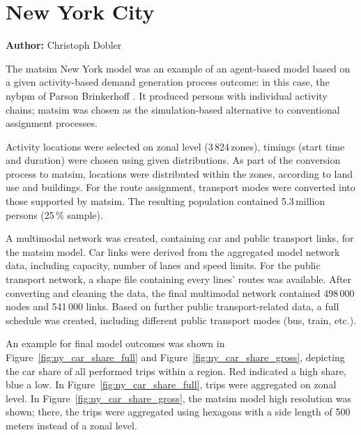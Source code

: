 \section{New York City}
\label{sec:nyc}
\hfill \textbf{Author:} Christoph Dobler


The \gls{matsim} New York model was an example of an agent-based model based on a given activity-based demand generation process outcome: in this case, the \gls{nybpm} of Parson Brinkerhoff \citep[][]{VovshaEtAl_TRR_2002, ParsonsBrinckerhoff_ResRep_NYBPM_2005, ParsonsBrinckerhoff_ResRep_NYBPM_2009}. It produced persons with individual activity chains; \gls{matsim} was chosen as the simulation-based alternative to conventional assignment processes.

Activity locations were selected on zonal level (3\,824\,zones), timings (\ie start time and duration) were chosen using given distributions. As part of the conversion process to \gls{matsim}, locations were distributed within the zones, according to land use and buildings. For the route assignment, transport modes were converted into those supported by \gls{matsim}. The resulting population contained 5.3\,million persons (25\,\% sample).

A \gls{multimodal} network was created, containing car and public transport links, for the \gls{matsim} model. Car links were derived from the aggregated model network data, including capacity, number of lanes and speed limits. For the public transport network, a shape file containing every lines' routes was available. After converting and cleaning the data, the final \gls{multimodal} network contained 498\,000 nodes and 541\,000 links. Based on further public transport-related data, a full schedule was created, including different public transport modes (bus, train, etc.).

An example for final model outcomes was shown in Figure~\ref{fig:ny_car_share_full} and Figure~\ref{fig:ny_car_share_gross}, depicting the car share of all performed trips within a region. Red indicated a high share, blue a low. In Figure~\ref{fig:ny_car_share_full}, trips were aggregated on zonal level. In Figure~\ref{fig:ny_car_share_gross}, the \gls{matsim} model high resolution was shown; there, the trips were aggregated using hexagons with a side length of 500\,meters instead of a zonal level.

